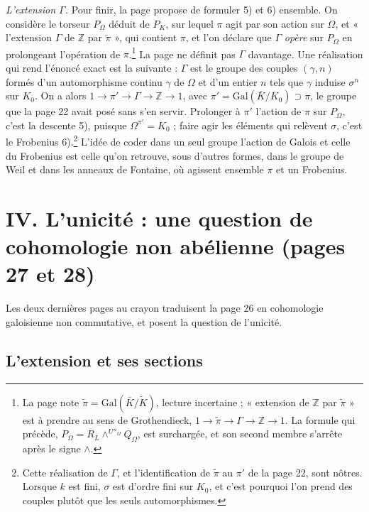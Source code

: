 \documentclass[11pt,a4paper]{article}
\begin{document}
\emph{L'extension $\Gamma$.} Pour finir, la page propose de formuler 5) et 6)
ensemble. On considère le torseur $P_{\Omega}$ déduit de $P_K$, sur lequel
$\pi$ agit par son action sur $\Omega$, et « l'extension $\Gamma$ de
$\mathbb{Z}$ par $\tilde{\pi}$ », qui contient $\pi$, et l'on déclare que
$\Gamma$ \emph{opère} sur $P_{\Omega}$ en prolongeant l'opération de
$\pi$.\footnote{La page note $\tilde{\pi} = \mathrm{Gal}(\bar{K}/\tilde{K})$,
lecture incertaine ; « extension de $\mathbb{Z}$ par $\tilde{\pi}$ » est à
prendre au sens de Grothendieck, $1 \to \tilde{\pi} \to \Gamma \to \mathbb{Z}
\to 1$. La formule qui précède, $P_{\Omega} = R_L \wedge^{U''_{\Omega}}
Q_{\Omega}$, est surchargée, et son second membre s'arrête après le signe
$\wedge$.} La page ne définit pas $\Gamma$ davantage. Une réalisation qui rend
l'énoncé exact est la suivante : $\Gamma$ est le groupe des couples
$(\gamma, n)$ formés d'un automorphisme continu $\gamma$ de $\Omega$ et d'un
entier $n$ tels que $\gamma$ induise $\sigma^n$ sur $K_0$. On a alors
$1 \to \pi' \to \Gamma \to \mathbb{Z} \to 1$, avec $\pi' =
\mathrm{Gal}(\bar{K}/K_0) \supset \pi$, le groupe que la page 22 avait posé
sans s'en servir. Prolonger à $\pi'$ l'action de $\pi$ sur $P_{\Omega}$, c'est
la descente 5), puisque $\Omega^{\pi'} = K_0$ ; faire agir les éléments qui
relèvent $\sigma$, c'est le Frobenius 6).\footnote{Cette réalisation de
$\Gamma$, et l'identification de $\tilde{\pi}$ au $\pi'$ de la page 22, sont
nôtres. Lorsque $k$ est fini, $\sigma$ est d'ordre fini sur $K_0$, et c'est
pourquoi l'on prend des couples plutôt que les seuls automorphismes.} L'idée de
coder dans un seul groupe l'action de Galois et celle du Frobenius est celle
qu'on retrouve, sous d'autres formes, dans le groupe de Weil et dans les
anneaux de Fontaine, où agissent ensemble $\pi$ et un Frobenius.

\section*{IV. L'unicité : une question de cohomologie non abélienne (pages 27 et 28)}

Les deux dernières pages au crayon traduisent la page 26 en cohomologie
galoisienne non commutative, et posent la question de l'unicité.

\subsection*{L'extension et ses sections}
\end{document}
